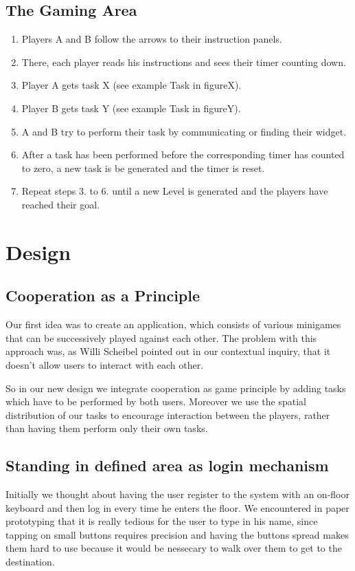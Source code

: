 \documentclass{sigchi}
\begin{document}
\subsection{The Gaming Area}
\vspace{2mm}
\begin{enumerate}
\item Players A and B follow the arrows to their instruction panels.
\item There, each player reads his instructions and sees their timer counting down.
\item Player A gets task X (see example Task in figureX).
\item Player B gets task Y (see example Task in figureY).
\item A and B try to perform their task by communicating or finding their widget.
\item After a task has been performed before the corresponding timer has counted to zero, a new task is be generated and the timer is reset.
\item Repeat steps 3. to 6. until a new Level is generated and the players have reached their goal.
\end{enumerate}




\section{Design}


\subsection{Cooperation as a Principle}
\vspace{1mm}
Our first idea was to create an application, which consists of various minigames that can be successively played against each other. The problem with this approach was, as Willi Scheibel pointed out in our contextual inquiry, that it doesn't allow users to interact with each other. 

So in our new design we integrate cooperation as game principle by adding tasks which have to be performed by both users. Moreover we use the spatial distribution of our tasks to encourage interaction between the players, rather than having them perform only their own tasks. 
 
\subsection{Standing in defined area as login mechanism}
\vspace{1mm}
Initially we thought about having the user register to the system with an on-floor keyboard and then log in every time he enters the floor. We encountered in paper prototyping that it is really tedious for the user to type in his name, since tapping on small buttons requires precision and having the buttons spread makes them hard to use because it would be nessecary to walk over them to get to the destination. 
\end{document}
